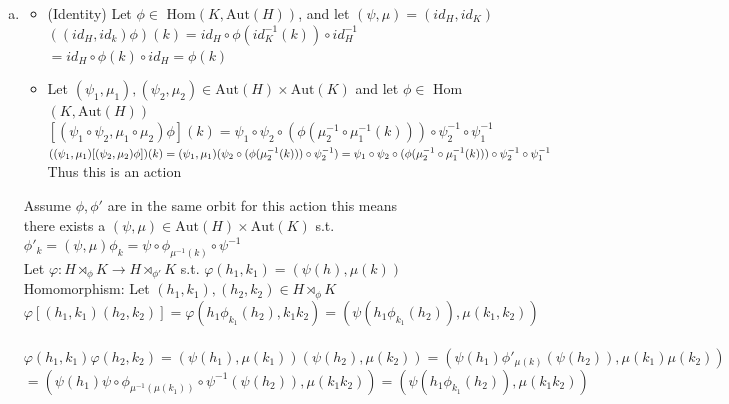 \documentclass[12pt, letterpaper]{article}
\theoremstyle{definition}
\renewcommand{\t}[1]{\text{#1}}
\begin{document}
\begin{enumerate}[(a)]
    The internal semidirect product, on the other hand, starts with a single group \(G\) that can be decomposed into two subgroups \(H \triangleleft G\) and \(K \leq G\). 
    Here, \(H\) is a normal subgroup, and \(K\) acts on \(H\) via conjugation: \(khk^{-1} \in H\) for \(k \in K\) and \(h \in H\). 
    Both constructions describe the same type of group structure, where the elements of one group act on another.
    \item \begin{itemize}
        \item (Identity) Let $\phi \in$ Hom$(K, \t{Aut}(H))$, and let $(\psi,\mu)=(id_H,id_K)$\\
        $((id_H,id_k)\phi)(k)=id_H \circ \phi(id_K^{-1}(k))\circ id_H^{-1}$\\
        $=id_H \circ \phi(k) \circ id_H = \phi(k)$
        \item Let $(\psi_1, \mu_1),(\psi_2,\mu_2) \in \t{Aut}(H) \times \t{Aut}(K)$ and let $\phi \in$ Hom$(K, \t{Aut}(H))$\\
        $[(\psi_1\circ\psi_2,\mu_1\circ\mu_2)\phi](k)=\psi_1\circ\psi_2\circ(\phi(\mu_2^{-1}\circ\mu_1^{-1}(k)))\circ\psi_2^{-1}\circ\psi_1^{-1}$\\
        $((\psi_1, \mu_1)[(\psi_2,\mu_2)\phi])(k)=(\psi_1, \mu_1)(\psi_2 \circ(\phi(\mu_2^{-1}(k)))\circ \psi_2^{-1})=\\
        \psi_1 \circ \psi_2 \circ(\phi(\mu_2^{-1}\circ\mu_1^{-1}(k)))\circ \psi_2^{-1} \circ \psi_1^{-1}$\\
        Thus this is an action
    \end{itemize}
    Assume $\phi, \phi'$ are in the same orbit for this action this means\\
    there exists a $(\psi,\mu)\in \t{Aut}(H) \times \t{Aut}(K)$ s.t. $\phi'_k = (\psi,\mu)\phi_k=\psi\circ\phi_{\mu^{-1}(k)}\circ\psi^{-1}$\\
    Let $\varphi : H \rtimes_\phi K \rightarrow H \rtimes_{\phi'} K$ s.t. $\varphi(h_1,k_1)=(\psi(h),\mu(k))$\\
    Homomorphism: Let $(h_1,k_1),(h_2,k_2) \in H \rtimes_{\phi} K$\\
    $\varphi[(h_1,k_1)(h_2,k_2)]=\varphi(h_1\phi_{k_1}(h_2),k_1k_2)=(\psi(h_1\phi_{k_1}(h_2)),\mu(k_1,k_2))$\\\
    $\varphi(h_1,k_1)\varphi(h_2,k_2)=(\psi(h_1),\mu(k_1))(\psi(h_2),\mu(k_2))=(\psi(h_1)\phi'_{\mu(k)}(\psi(h_2)),\mu(k_1)\mu(k_2))$\\
    $=(\psi(h_1)\psi\circ\phi_{\mu^{-1}(\mu(k_1))}\circ\psi^{-1}(\psi(h_2)),\mu(k_1k_2))=(\psi(h_1\phi_{k_1}(h_2)),\mu(k_1k_2))$\\

\end{enumerate}
\end{document}
